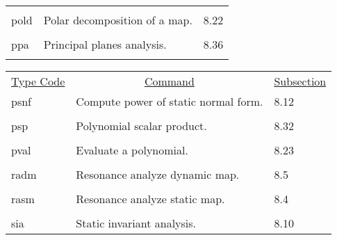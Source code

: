 \begin{center}
\begin{tabular}{lll}
\vspace{-3mm}& &\\
\hspace{1.5em}pold    &           Polar decomposition of a map.  & \hspace{2em}8.22\\
\vspace{-3mm}& &\\
\hspace{1.5em}ppa    &          Principal planes analysis.  & \hspace{2em}8.36\\
\vspace{-3mm}& &\\
\end{tabular}



\begin{tabular}{lll}
\multicolumn{1}{c}{\underline{Type Code}} &
\multicolumn{1}{c}{\underline{Command}}   &
\multicolumn{1}{c}{\underline{Subsection}} \\
\hspace{1.5em}psnf    &    Compute power of static normal form. &  \hspace{2em}8.12\\
\vspace{-3mm}& &\\\hspace{1.5em}psp    &           Polynomial scalar product. & \hspace{2em}8.32\\
\vspace{-3mm}& &\\
\hspace{1.5em}pval    &           Evaluate a polynomial.       &  \hspace{2em}8.23\\
\vspace{-3mm}& &\\
\hspace{1.5em}radm    &           Resonance analyze dynamic map. &  \hspace{2em}8.5\\
\vspace{-3mm}& &\\
\hspace{1.5em}rasm    &           Resonance analyze static map.  &  \hspace{2em}8.4\\
\vspace{-3mm}& &\\
\hspace{1.5em}sia     &           Static invariant analysis.     &  \hspace{2em}8.10\\

\end{tabular}
\end{center}
